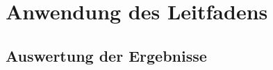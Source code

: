 \documentclass[11pt]{article}
\begin{document}
\section{Anwendung des Leitfadens}
\subsection{Auswertung der Ergebnisse}
\end{document}
